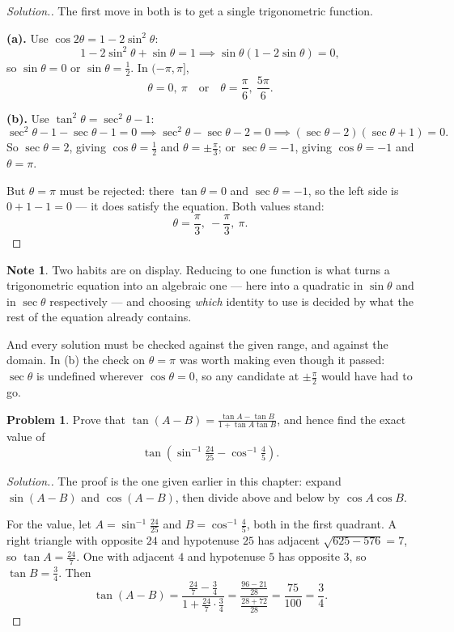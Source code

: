 \documentclass[11pt,a4paper]{article}
\theoremstyle{definition}
\newtheorem{note}[thm]{Note}
\newtheorem{problemx}{Problem}[section]
\newenvironment{problem}{\begin{problemx}}{\end{problemx}}
\newenvironment{solution}
  {\renewcommand{\qedsymbol}{}\begin{proof}[\textit{Solution}.]}
  {\end{proof}}
\begin{document}
\begin{solution}
The first move in both is to get a single trigonometric function.

\textbf{(a).} Use $\cos 2\theta=1-2\sin^{2}\theta$:
$$1-2\sin^{2}\theta+\sin\theta=1
\implies \sin\theta\left(1-2\sin\theta\right)=0 ,$$
so $\sin\theta=0$ or $\sin\theta=\frac{1}{2}$. In $(-\pi,\pi]$,
$$\theta=0,\ \pi \quad \text{or}\quad 
\theta=\frac{\pi}{6},\ \frac{5\pi}{6}.$$

\textbf{(b).} Use $\tan^{2}\theta=\sec^{2}\theta-1$:
$$\sec^{2}\theta-1-\sec\theta-1=0
\implies \sec^{2}\theta-\sec\theta-2=0
\implies \left(\sec\theta-2\right)\left(\sec\theta+1\right)=0 .$$
So $\sec\theta=2$, giving $\cos\theta=\frac{1}{2}$ and
$\theta=\pm\frac{\pi}{3}$; or $\sec\theta=-1$, giving $\cos\theta=-1$ and
$\theta=\pi$.

But $\theta=\pi$ must be rejected: there $\tan\theta=0$ and $\sec\theta=-1$, so the
left side is $0+1-1=0$ --- it does satisfy the equation. Both values stand:
$$\theta=\frac{\pi}{3},\ -\frac{\pi}{3},\ \pi .$$
\end{solution}

\begin{note}
Two habits are on display. Reducing to one function is what turns a trigonometric
equation into an algebraic one --- here into a quadratic in $\sin\theta$ and in
$\sec\theta$ respectively --- and choosing \emph{which} identity to use is decided by
what the rest of the equation already contains.

And every solution must be checked against the given range, and against the
domain. In (b) the check on $\theta=\pi$ was worth making even though it passed:
$\sec\theta$ is undefined wherever $\cos\theta=0$, so any candidate at
$\pm\frac{\pi}{2}$ would have had to go.
\end{note}

\begin{problem}
Prove that $\tan(A-B)=\frac{\tan A-\tan B}{1+\tan A\tan B}$, and hence find the
exact value of
$$\tan\left(\sin^{-1}\tfrac{24}{25}-\cos^{-1}\tfrac{4}{5}\right).$$
\end{problem}

\begin{solution}
The proof is the one given earlier in this chapter: expand $\sin(A-B)$ and
$\cos(A-B)$, then divide above and below by $\cos A\cos B$.

For the value, let $A=\sin^{-1}\frac{24}{25}$ and $B=\cos^{-1}\frac{4}{5}$, both in
the first quadrant. A right triangle with opposite $24$ and hypotenuse $25$ has
adjacent $\sqrt{625-576}=7$, so $\tan A=\frac{24}{7}$. One with adjacent $4$ and
hypotenuse $5$ has opposite $3$, so $\tan B=\frac{3}{4}$. Then
$$\tan(A-B)=\frac{\frac{24}{7}-\frac{3}{4}}{1+\frac{24}{7}\cdot\frac{3}{4}}
=\frac{\frac{96-21}{28}}{\frac{28+72}{28}}
=\frac{75}{100}=\frac{3}{4}.$$
\end{solution}
\end{document}
